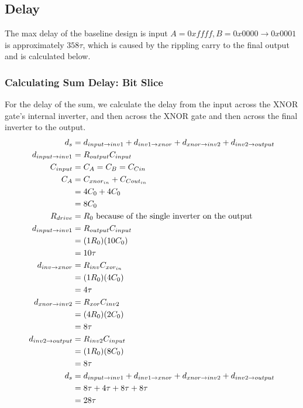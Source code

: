\documentclass{article}
\begin{document}
\subsection{Delay} 
The max delay of the baseline design is input $A = 0xffff, B = 0x0000 \rightarrow 0x0001$ is approximately $358\tau$, which is caused by the rippling carry to the final output and is calculated below.\\

\subsubsection{Calculating Sum Delay: Bit Slice}
For the delay of the sum, we calculate the delay from the input across the XNOR gate's internal inverter, and then across the XNOR gate and then across the final inverter to the output.
\begin{align*}
d_{s} &= d_{input \rightarrow inv1} + d_{inv1 \rightarrow xnor} + d_{xnor \rightarrow inv2} + d_{inv2 \rightarrow output}\\
d_{input \rightarrow inv1} &= R_{output}C_{input}\\
C_{input} &= C_A = C_B = C_{Cin}\\
C_A &= C_{xnor_{in}} + C_{Cout_{in}}\\
&= 4C_0 + 4C_0\\
&= 8C_0\\
R_{drive} &= R_0\textnormal{ because of the single inverter on the output}\\
d_{input \rightarrow inv1} &= R_{output}C_{input}\\
&= (1R_0)(10C_0)\\
&= 10\tau\\
d_{inv \rightarrow xnor} &=  R_{inv}C_{xor_{in}}\\
&= (1R_0)(4C_0)\\
&= 4\tau\\
d_{xnor \rightarrow inv2} &= R_{xor}C_{inv2}\\
&= (4R_0)(2C_0)\\
&= 8 \tau\\
d_{inv2 \rightarrow output} &= R_{inv2}C_{input}\\
&= (1R_0)(8C_0)\\
&= 8\tau\\
d_{s} &= d_{input \rightarrow inv1} + d_{inv1 \rightarrow xnor} + d_{xnor \rightarrow inv2} + d_{inv2 \rightarrow output}\\
&= 8\tau + 4\tau + 8\tau + 8\tau\\
&= 28\tau
\end{align*}
\end{document}
